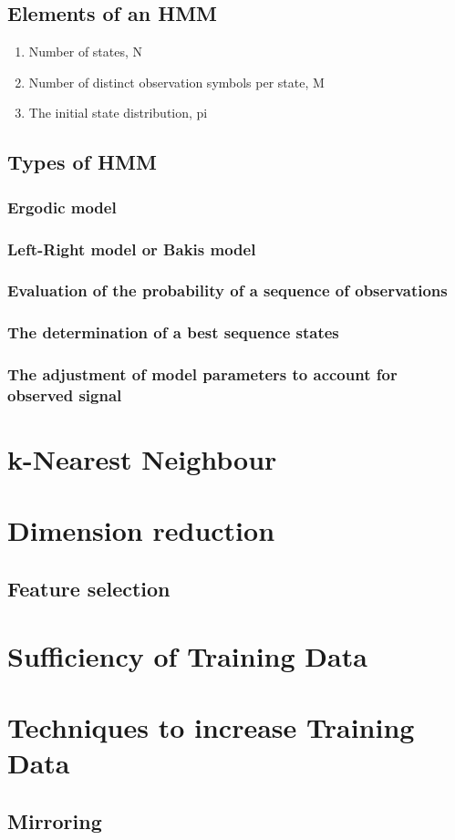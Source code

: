 \subsection{Elements of an HMM}
\begin{enumerate}
	\item Number of states, N
	\item Number of distinct observation symbols per state, M
\item The initial state distribution, pi
\end{enumerate}

\subsection{Types of HMM}
\subsubsection{Ergodic model}
\subsubsection{Left-Right model or Bakis model}
\subsubsection{Evaluation of the probability of a sequence of observations}
\subsubsection{The determination of a best sequence states}
\subsubsection{The adjustment of model parameters to account for observed signal}
\section{k-Nearest Neighbour}
\section{Dimension reduction}
\subsection{Feature selection}
\section{Sufficiency of Training Data}
\section{Techniques to increase Training Data}
\subsection{Mirroring}